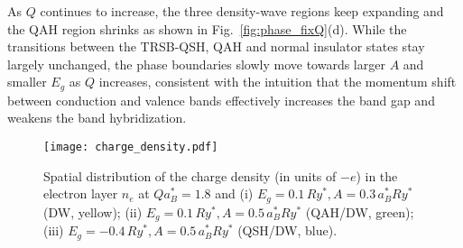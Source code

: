 \documentclass[reprint,aps,superscriptaddress]{revtex4-2}
\begin{document}
As $Q$ continues to increase, the three density-wave regions keep expanding and the QAH region shrinks as shown in Fig.~\ref{fig:phase_fixQ}(d).
While the transitions between the TRSB-QSH, QAH and normal insulator states stay largely unchanged, the phase boundaries slowly move towards larger $A$ and smaller $E_g$ as $Q$ increases, consistent with the intuition that the momentum shift between conduction and valence bands effectively increases the band gap and weakens the band hybridization.



\begin{figure}
\centering
\texttt{[image: charge\_density.pdf]}
\caption{Spatial distribution of the charge density (in units of $-e$) in the electron layer $n_e$ at $Qa_B^*=1.8$ and (i) $E_g=0.1\,Ry^*, A=0.3\,a_B^* Ry^*$ (DW, yellow); (ii) $E_g=0.1\,Ry^*, A=0.5\,a_B^* Ry^*$ (QAH/DW, green); (iii) $E_g=-0.4\,Ry^*, A=0.5\,a_B^* Ry^*$ (QSH/DW, blue).} \label{fig:charge_density}
\end{figure}
\end{document}
